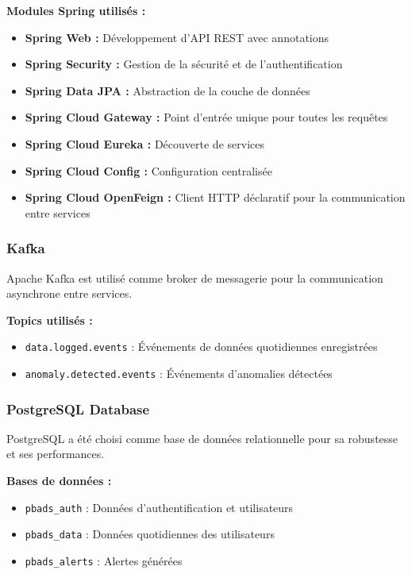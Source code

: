 \textbf{Modules Spring utilisés :}
\begin{itemize}
    \item \textbf{Spring Web :} Développement d'API REST avec annotations
    \item \textbf{Spring Security :} Gestion de la sécurité et de l'authentification
    \item \textbf{Spring Data JPA :} Abstraction de la couche de données
    \item \textbf{Spring Cloud Gateway :} Point d'entrée unique pour toutes les requêtes
    \item \textbf{Spring Cloud Eureka :} Découverte de services
    \item \textbf{Spring Cloud Config :} Configuration centralisée
    \item \textbf{Spring Cloud OpenFeign :} Client HTTP déclaratif pour la communication entre services
\end{itemize}

\subsubsection{Kafka}

Apache Kafka est utilisé comme broker de messagerie pour la communication asynchrone entre services.

\textbf{Topics utilisés :}
\begin{itemize}
    \item \texttt{data.logged.events} : Événements de données quotidiennes enregistrées
    \item \texttt{anomaly.detected.events} : Événements d'anomalies détectées
\end{itemize}

\subsubsection{PostgreSQL Database}

PostgreSQL a été choisi comme base de données relationnelle pour sa robustesse et ses performances.

\textbf{Bases de données :}
\begin{itemize}
    \item \texttt{pbads\_auth} : Données d'authentification et utilisateurs
    \item \texttt{pbads\_data} : Données quotidiennes des utilisateurs
    \item \texttt{pbads\_alerts} : Alertes générées
\end{itemize}

